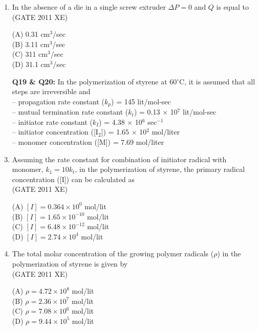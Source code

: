\documentclass[journal,12pt,onecolumn]{IEEEtran}
\begin{document}
\begin{enumerate}[label=\arabic*)]
\item In the absence of a die in a single screw extruder $\Delta P = 0$ and $Q$ is equal to\\

\hfill{(GATE 2011 XE)} \\
\begin{multicols}{4}
(A) 0.31 cm$^3$/sec\\
(B) 3.11 cm$^3$/sec\\
(C) 311 cm$^3$/sec\\
(D) 31.1 cm$^3$/sec
\end{multicols}

\item[\textbf{Q19 \& Q20:}] In the polymerization of styrene at 60$^\circ$C, it is assumed that all steps are irreversible and\\
-- propagation rate constant ($k_p$) = 145 lit/mol-sec\\
-- mutual termination rate constant ($k_t$) = 0.13 $\times$ 10$^7$ lit/mol-sec\\
-- initiator rate constant ($k_I$) = 4.38 $\times$ 10$^6$ sec$^{-1}$\\
-- initiator concentration ([I$_2$]) = 1.65 $\times$ 10$^2$ mol/liter\\
-- monomer concentration ([M]) = 7.69 mol/liter\\

\item Assuming the rate constant for combination of initiator radical with monomer, $k_1 = 10 k_t$, in the polymerization of styrene, the primary radical concentration ([I]) can be calculated as\\

\hfill{(GATE 2011 XE)} \\
\begin{multicols}{4}
(A) $[I] = 0.364 \times 10^0$ mol/lit\\
(B) $[I] = 1.65 \times 10^{-10}$ mol/lit\\
(C) $[I] = 6.48 \times 10^{-12}$ mol/lit\\
(D) $[I] = 2.74 \times 10^4$ mol/lit
\end{multicols}

\item The total molar concentration of the growing polymer radicals ($\rho$) in the polymerization of styrene is given by\\

\hfill{(GATE 2011 XE)} \\
\begin{multicols}{4}
(A) $\rho = 4.72 \times 10^8$ mol/lit\\
(B) $\rho = 2.36 \times 10^7$ mol/lit\\
(C) $\rho = 7.08 \times 10^6$ mol/lit\\
(D) $\rho = 9.44 \times 10^5$ mol/lit
\end{multicols}


\end{enumerate}
\end{document}
